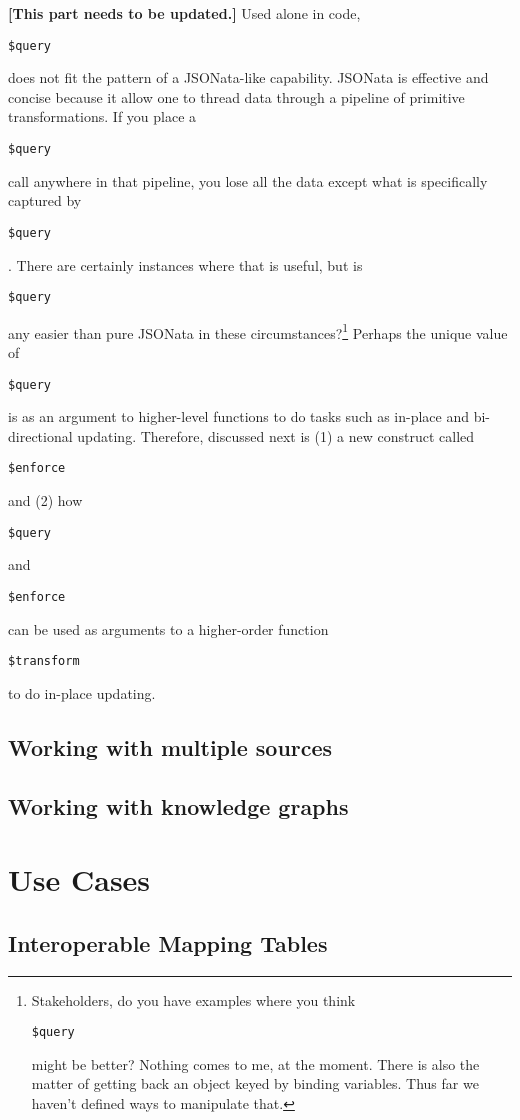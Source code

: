 \documentclass[9pt,letterpaper]{article}
\newcommand{\stt}[1]{\begin{footnotesize}\texttt{#1}\end{footnotesize}}
\begin{document}
\textbf{[This part needs to be updated.]} Used alone in code, \stt{\$query} does not fit the pattern of a JSONata-like capability.
JSONata is effective and concise because it allow one to thread data through a pipeline of primitive transformations.
If you place a \stt{\$query} call anywhere in that pipeline, you lose all the data except what is specifically captured by \stt{\$query}.
There are certainly instances where that is useful, but is \stt{\$query} any easier than pure JSONata in these circumstances?\footnote{Stakeholders, do you have
  examples where you think \stt{\$query} might be better?
  Nothing comes to me, at the moment.
  There is also the matter of getting back an object keyed by binding variables.
  Thus far we haven't defined ways to manipulate that.}
Perhaps the unique value of \stt{\$query} is as an argument to higher-level functions to do tasks such as in-place and bi-directional updating.
Therefore, discussed next is (1) a new construct called \stt{\$enforce} and (2) how \stt{\$query} and \stt{\$enforce} can be used as arguments to a higher-order function \stt{\$transform} to do in-place updating.

\subsection{Working with multiple sources}

\subsection{Working with knowledge graphs}



\section{Use Cases}

\subsection{Interoperable Mapping Tables}
\end{document}
